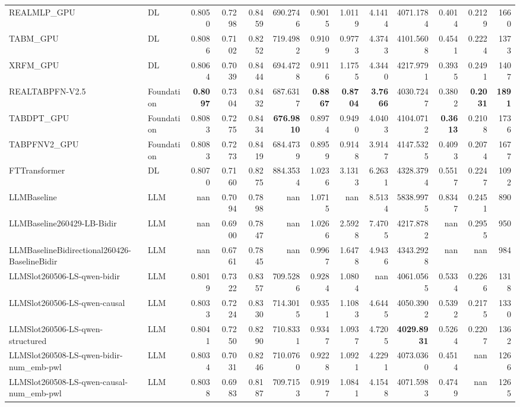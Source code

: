 \begin{table}[htbp]
{\begin{tabular}{ll|rrrrrrrrrr|r}
REALMLP\_GPU & DL & 0.8050 & 0.7298 & 0.8459 & 690.2746 & 0.9015 & 1.0119 & 4.1414 & 4071.1784 & 0.4014 & 0.2129 & 1660 \\
TABM\_GPU & DL & 0.8086 & 0.7102 & 0.8252 & 719.4982 & 0.9109 & 0.9773 & 4.3743 & 4101.5608 & 0.4541 & 0.2224 & 1373 \\
XRFM\_GPU & DL & 0.8064 & 0.7039 & 0.8444 & 694.4728 & 0.9116 & 1.1755 & 4.3440 & 4217.9791 & 0.3935 & 0.2491 & 1407 \\
REALTABPFN-V2.5 & Foundation & \textbf{0.8097} & 0.7304 & 0.8432 & 687.6317 & \textbf{0.8867} & \textbf{0.8704} & \textbf{3.7666} & 4030.7247 & 0.3802 & \textbf{0.2031} & \textbf{1891} \\
TABDPT\_GPU & Foundation & 0.8083 & 0.7275 & 0.8434 & \textbf{676.9810} & 0.8974 & 0.9490 & 4.0403 & 4104.0712 & \textbf{0.3613} & 0.2108 & 1736 \\
TABPFNV2\_GPU & Foundation & 0.8083 & 0.7273 & 0.8419 & 684.4739 & 0.8959 & 0.9148 & 3.9147 & 4147.5325 & 0.4093 & 0.2074 & 1677 \\
\midrule
FTTransformer & DL & 0.8070 & 0.7160 & 0.8275 & 884.3534 & 1.0236 & 3.1313 & 6.2631 & 4328.3794 & 0.5517 & 0.2247 & 1092 \\
LLMBaseline & LLM & nan & 0.7094 & 0.7898 & nan & 1.0715 & nan & 8.5134 & 5838.9975 & 0.8347 & 0.2451 & 890 \\
LLMBaseline260429-LB-Bidir & LLM & nan & 0.6900 & 0.7847 & nan & 1.0266 & 2.5928 & 7.4705 & 4217.8782 & nan & 0.2955 & 950 \\
LLMBaselineBidirectional260426-BaselineBidir & LLM & nan & 0.6761 & 0.7845 & nan & 0.9967 & 1.6478 & 4.9436 & 4343.2928 & nan & nan & 984 \\
LLMSlot260506-LS-qwen-bidir & LLM & 0.8019 & 0.7322 & 0.8357 & 709.5286 & 0.9284 & 1.0804 & nan & 4061.0565 & 0.5334 & 0.2266 & 1318 \\
LLMSlot260506-LS-qwen-causal & LLM & 0.8033 & 0.7224 & 0.8330 & 714.3015 & 0.9351 & 1.1083 & 4.6445 & 4050.3902 & 0.5392 & 0.2175 & 1330 \\
LLMSlot260506-LS-qwen-structured & LLM & 0.8041 & 0.7250 & 0.8290 & 710.8331 & 0.9347 & 1.0937 & 4.7205 & \textbf{4029.8931} & 0.5264 & 0.2207 & 1362 \\
LLMSlot260508-LS-qwen-bidir-num\_emb-pwl & LLM & 0.8034 & 0.7031 & 0.8246 & 710.0760 & 0.9228 & 1.0921 & 4.2291 & 4073.0360 & 0.4514 & nan & 1266 \\
LLMSlot260508-LS-qwen-causal-num\_emb-pwl & LLM & 0.8038 & 0.6983 & 0.8187 & 709.7153 & 0.9197 & 1.0841 & 4.1548 & 4071.5983 & 0.4749 & nan & 1265 \\

\end{tabular}}
\end{table}

